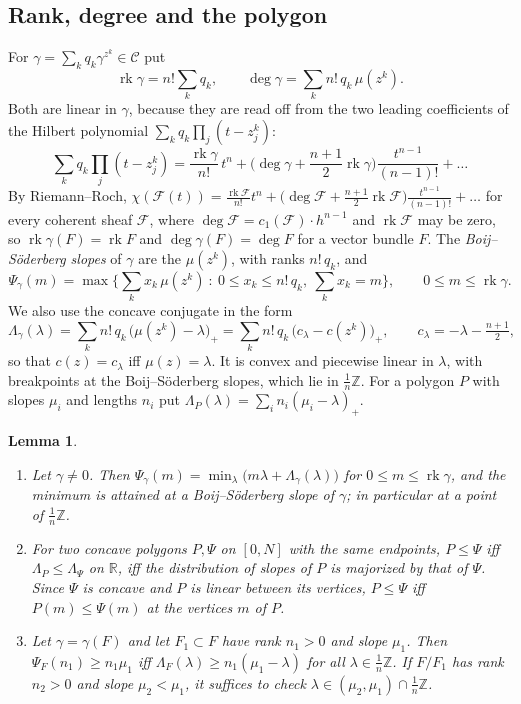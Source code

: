 \documentclass[11pt]{amsart}
\newtheorem{lemma}[theorem]{Lemma}
\theoremstyle{definition}
\theoremstyle{remark}
\newcommand{\RR}{\mathbb{R}}
\newcommand{\ZZ}{\mathbb{Z}}
\newcommand{\cF}{\mathcal{F}}
\newcommand{\CC}{\mathcal{C}}
\DeclareMathOperator{\rk}{rk}
\begin{document}
\subsection{Rank, degree and the polygon}
For $\gamma=\sum_kq_k\gamma^{z^k}\in\CC$ put
\[
\rk\gamma=n!\sum_kq_k,\qquad \deg\gamma=\sum_kn!\,q_k\,\mu(z^k).
\]
Both are linear in $\gamma$, because they are read off from the two leading coefficients of the Hilbert polynomial $\sum_kq_k\prod_j(t-z^k_j)$:
\[
\sum_kq_k\prod_j(t-z^k_j)=\frac{\rk\gamma}{n!}\,t^n+\Big(\deg\gamma+\frac{n+1}2\rk\gamma\Big)\frac{t^{n-1}}{(n-1)!}+\dots
\]
By Riemann--Roch, $\chi(\cF(t))=\frac{\rk\cF}{n!}t^n+\big(\deg\cF+\frac{n+1}2\rk\cF\big)\frac{t^{n-1}}{(n-1)!}+\dots$ for every coherent sheaf $\cF$, where $\deg\cF=c_1(\cF)\cdot h^{n-1}$ and $\rk\cF$ may be zero, so $\rk\gamma(F)=\rk F$ and $\deg\gamma(F)=\deg F$ for a vector bundle $F$. The \emph{Boij--Söderberg slopes} of $\gamma$ are the $\mu(z^k)$, with ranks $n!\,q_k$, and
\[
\Psi_\gamma(m)=\max\Big\{\sum_kx_k\,\mu(z^k)\ :\ 0\le x_k\le n!\,q_k,\ \sum_kx_k=m\Big\},\qquad 0\le m\le\rk\gamma .
\]
We also use the concave conjugate in the form
\[
\Lambda_\gamma(\lambda)=\sum_kn!\,q_k\,\big(\mu(z^k)-\lambda\big)_+=\sum_kn!\,q_k\,\big(c_\lambda-c(z^k)\big)_+,\qquad c_\lambda=-\lambda-\tfrac{n+1}2 ,
\]
so that $c(z)=c_\lambda$ iff $\mu(z)=\lambda$. It is convex and piecewise linear in $\lambda$, with breakpoints at the Boij--Söderberg slopes, which lie in $\frac1n\ZZ$. For a polygon $P$ with slopes $\mu_i$ and lengths $n_i$ put $\Lambda_P(\lambda)=\sum_in_i(\mu_i-\lambda)_+$.

\begin{lemma}\label{lem:legendre}
\begin{enumerate}[label=\textup{(\roman*)}]
\item Let $\gamma\ne0$. Then $\Psi_\gamma(m)=\min_\lambda\big(m\lambda+\Lambda_\gamma(\lambda)\big)$ for $0\le m\le\rk\gamma$, and the minimum is attained at a Boij--Söderberg slope of $\gamma$; in particular at a point of $\frac1n\ZZ$.
\item For two concave polygons $P,\Psi$ on $[0,N]$ with the same endpoints, $P\le\Psi$ iff $\Lambda_P\le\Lambda_\Psi$ on $\RR$, iff the distribution of slopes of $P$ is majorized by that of $\Psi$. Since $\Psi$ is concave and $P$ is linear between its vertices, $P\le\Psi$ iff $P(m)\le\Psi(m)$ at the vertices $m$ of $P$.
\item Let $\gamma=\gamma(F)$ and let $F_1\subset F$ have rank $n_1>0$ and slope $\mu_1$. Then $\Psi_F(n_1)\ge n_1\mu_1$ iff $\Lambda_F(\lambda)\ge n_1(\mu_1-\lambda)$ for all $\lambda\in\frac1n\ZZ$. If $F/F_1$ has rank $n_2>0$ and slope $\mu_2<\mu_1$, it suffices to check $\lambda\in(\mu_2,\mu_1)\cap\frac1n\ZZ$.
\end{enumerate}
\end{lemma}
\end{document}
